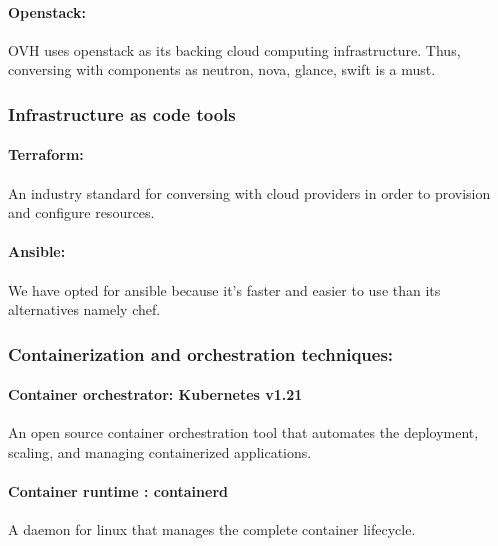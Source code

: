 \paragraph{Openstack\cite{OpenStack}: }

\hspace{7mm}OVH uses openstack as its backing cloud computing infrastructure. Thus, conversing with components as neutron, nova, glance, swift is a must. 

\subsubsection{Infrastructure as code tools }

\paragraph{Terraform\cite{Terraform}: }

\hspace{7mm}An industry standard for conversing with cloud providers in order to provision and configure resources. 

\paragraph{Ansible\cite{Ansible}: }

\hspace{7mm}We have opted for ansible because it’s faster and easier to use than its alternatives namely chef.  

\subsubsection{Containerization and orchestration techniques: }

\paragraph{Container orchestrator: Kubernetes v1.21\cite{Kubernetes} }

\hspace{7mm}An open source container orchestration tool that automates the deployment, scaling, and managing containerized applications. 

\paragraph{Container runtime : containerd }

\hspace{7mm}A daemon for linux that manages the complete container lifecycle. 

